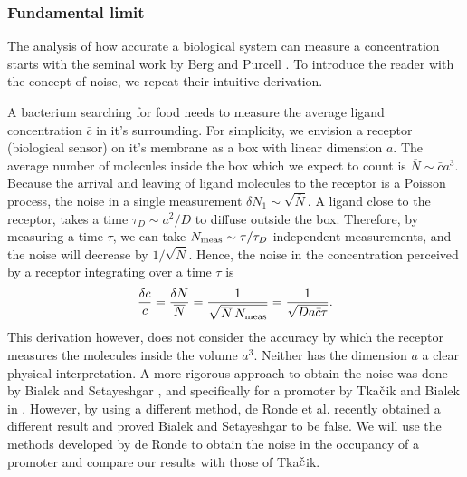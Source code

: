 \subsubsection{Fundamental limit}
The analysis of how accurate a biological system can measure a concentration starts with the seminal work by Berg and Purcell \cite{Berg1977}. To introduce the reader with the concept of noise, we repeat their intuitive derivation. 

A bacterium searching for food needs to measure the average ligand concentration $\bar{c}$ in it's surrounding. For simplicity, we envision a receptor (biological sensor) on it's membrane as a box with linear dimension $a$. The average number of molecules inside the box which we expect to count is $\overline{N} \sim \bar{c} a^3$. Because the arrival and leaving of ligand molecules to the receptor is a Poisson process, the noise in a single measurement $\delta N_1 \sim \sqrt{\overline{N}}$. A ligand close to the receptor, takes a time $\tau_D \sim a^2/D$ to diffuse outside the box. Therefore, by measuring a time $\tau$, we can take $N_{\rm meas} \sim \tau/\tau_D$ independent measurements, and the noise will decrease by $1/\sqrt{\overline{N}}$. Hence, the noise in the concentration perceived by a receptor integrating over a time $\tau$ is
\begin{equation}
 \frac{\delta c}{\bar{c}} = \frac{\delta N}{\overline{N}} = \frac{1}{\sqrt{\overline{N}\,N_{\rm meas}}} = \frac{1}{\sqrt{D a \bar{c} \tau}}.
\end{equation}
This derivation however, does not consider the accuracy by which the receptor measures the molecules inside the volume $a^3$. Neither has the dimension $a$ a clear physical interpretation. A more rigorous approach to obtain the noise was done by Bialek and Setayeshgar \cite{Bialek2005}, and specifically for a promoter by Tka$\check{\rm c}$ik and Bialek in \cite{Tkacik2009}. However, by using a different method, de Ronde et al. recently obtained a different result \cite{DeRonde2012} and proved Bialek and Setayeshgar to be false. We will use the methods developed by de Ronde to obtain the noise in the occupancy of a promoter and compare our results with those of Tka$\check{\rm c}$ik.

